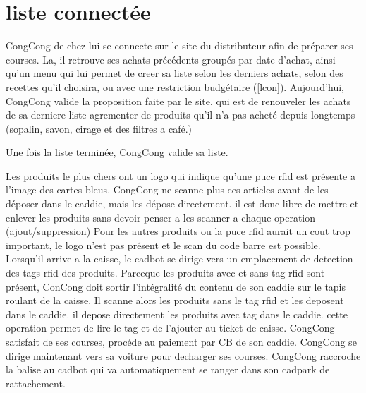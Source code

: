 \section{liste connectée}

CongCong de chez lui se connecte sur le site du distributeur afin de préparer ses courses.
La, il retrouve ses achats précédents groupés par date d'achat, ainsi qu'un menu qui lui permet de creer sa liste selon les derniers achats, selon des recettes qu'il choisira, ou avec une restriction budgétaire ([lcon]). 
Aujourd'hui, CongCong valide la proposition faite par le site, qui est de renouveler les achats de sa derniere liste agrementer de produits qu'il n'a pas acheté depuis longtemps (sopalin, savon, cirage et des filtres a café.)

Une fois la liste terminée, CongCong valide sa liste.

Les produits le plus chers ont un logo qui indique qu'une puce rfid est présente a l'image des cartes bleus. 
CongCong ne scanne plus ces articles avant de les déposer dans le caddie, mais les dépose directement.
il est donc libre de mettre et enlever les produits sans devoir penser a les scanner a chaque operation (ajout/suppression)
Pour les autres produits ou la puce rfid aurait un cout trop important, le logo n'est pas présent et le scan du code barre est possible.
Lorsqu'il arrive a la caisse, le cadbot se dirige vers un emplacement de detection des tags rfid des produits.
Parceque les produits avec et sans tag rfid sont présent, ConCong doit sortir l'intégralité du contenu de son caddie sur le tapis roulant de la caisse.
Il scanne alors les produits sans le tag rfid et les deposent dans le caddie. il depose directement les produits avec tag dans le caddie. cette operation permet de lire le tag et de l'ajouter au ticket de caisse.
CongCong satisfait de ses courses, procéde au paiement par CB de son caddie.
CongCong se dirige maintenant vers sa voiture pour decharger ses courses.
CongCong raccroche la balise au cadbot qui va automatiquement se ranger dans son cadpark de rattachement.


